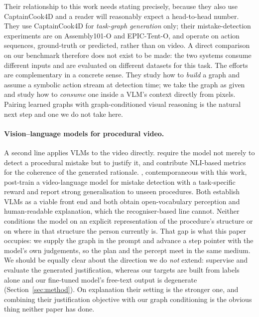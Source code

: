 \documentclass[10pt,twocolumn]{article}
\begin{document}
Their relationship to this work needs stating precisely, because they also use
CaptainCook4D and a reader will reasonably expect a head-to-head number. They
use CaptainCook4D for \emph{task-graph generation} only; their mistake-detection
experiments are on Assembly101-O and EPIC-Tent-O, and operate on action
sequences, ground-truth or predicted, rather than on video. A direct
comparison on our benchmark therefore does not exist to be made: the two systems
consume different inputs and are evaluated on different datasets for this task.
The efforts are complementary in a concrete sense. They study how to
\emph{build} a graph and assume a symbolic action stream at detection time; we
take the graph as given and study how to \emph{consume} one inside a VLM's
context directly from pixels. Pairing learned graphs with graph-conditioned
visual reasoning is the natural next step and one we do not take here.

\paragraph{Vision--language models for procedural video.}
A second line applies VLMs to the video directly.
\citet{storks2025transparent} require the model not merely to detect a
procedural mistake but to justify it, and contribute NLI-based metrics for the
coherence of the generated rationale. \citet{spurio2026posttraining},
contemporaneous with this work, post-train a video-language model for mistake
detection with a task-specific reward and report strong generalisation to unseen
procedures. Both establish VLMs as a viable front end and both obtain
open-vocabulary perception and human-readable explanation, which the
recogniser-based line cannot. Neither conditions the model on an explicit
representation of the procedure's structure or on where in that structure the
person currently is. That gap is what this paper occupies: we supply the graph
in the prompt and advance a step pointer with the model's own judgements, so the
plan and the percept meet in the same medium. We should be equally clear about
the direction we do \emph{not} extend: \citet{storks2025transparent} supervise
and evaluate the generated justification, whereas our targets are built from
labels alone and our fine-tuned model's free-text output is degenerate
(Section~\ref{sec:method}). On explanation their setting is the stronger one,
and combining their justification objective with our graph conditioning is the
obvious thing neither paper has done.
\end{document}
